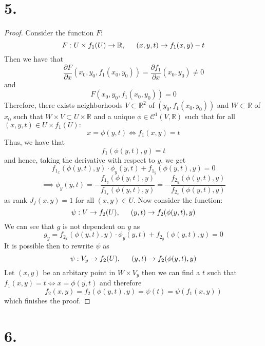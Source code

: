 \documentclass[11pt]{article}
\begin{document}
\section*{5.}
\begin{proof}
Consider the function $F$:
\[
    F: U \times f_1(U) \to \mathbb{R}, \indent (x,y,t) \to f_1(x,y) - t    
\]
Then we have that
\[
    \frac{\partial F}{\partial x}(x_0,y_0,f_1(x_0,y_0)) = \frac{\partial f_1}{\partial x}(x_0,y_0) \ne 0   
\]
and 
\[
    F(x_0,y_0,f_1(x_0,y_0)) = 0    
\]
Therefore, there exists neighborhoods $V \subset \mathbb{R}^2$ of $(y_0,f_1(x_0,y_0))$ and
$W \subset \mathbb{R}$ of $x_0$ such that $W \times V \subset U \times \mathbb{R}$ and 
a unique $\phi \in \mathcal{C}^1(V, \mathbb{R})$ such that for all $(x,y,t) \in U \times f_1(U):$
\[
    x = \phi(y,t) \iff f_1(x,y) = t 
\]
Thus, we have that
\[
    f_1(\phi(y,t),y) = t
\]
and hence, taking the derivative with respect to $y$, we get
\[
    f_{1_x}(\phi(y,t),y) \cdot \phi_y(y,t) + f_{1_y}(\phi(y,t),y) = 0
\]
\[
    \implies \phi_y(y,t) = -\frac{f_{1_y}(\phi(y,t),y)}{f_{1_x}(\phi(y,t),y)} = -\frac{f_{2_y}(\phi(y,t),y)}{f_{2_x}(\phi(y,t),y)} 
\]
as rank $J_f(x,y) = 1$ for all $(x,y) \in U$.
Now consider the function:
\[
    \psi: V \to f_2(U), \indent (y,t) \to f_2(\phi(y,t),y)
\]
We can see that $g$ is not dependent on $y$ as 
\[
    g_y = f_{2_x}(\phi(y,t),y) \cdot \phi_y(y,t) + f_{2_y}(\phi(y,t),y) = 0
\]
It is possible then to rewrite $\psi$ as 
\[
    \psi: V_y \to f_2(U), \indent (y,t) \to f_2(\phi(y,t),y)    
\]
Let $(x, y)$ be an arbitary point in $W \times V_y$ 
then we can find a $t$ such that $f_1(x,y) = t \iff x = \phi(y,t)$ and therefore
\[
    f_2(x,y) = f_2(\phi(y,t),y) = \psi(t) = \psi(f_1(x,y))    
\]
which finishes the proof.
\end{proof}
\pagebreak
\section*{6.}
\end{document}

